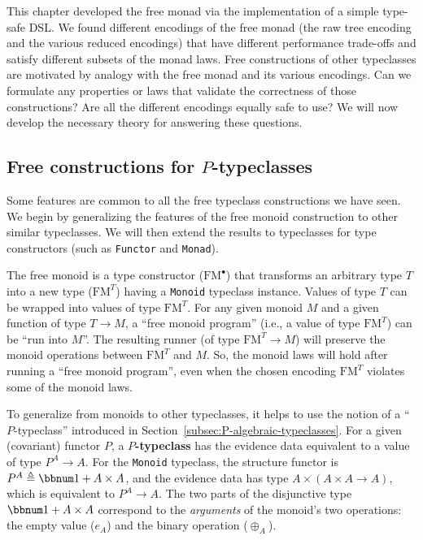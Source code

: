 This chapter developed the free monad via the implementation of a
simple type-safe DSL. We found different encodings of the free monad
(the raw tree encoding and the various reduced encodings) that have
different performance trade-offs and satisfy different subsets of
the monad laws. Free constructions of other typeclasses are motivated
by analogy with the free monad and its various encodings. Can we formulate
any properties or laws that validate the correctness of those constructions?
Are all the different encodings equally safe to use? We will now develop
the necessary theory for answering these questions.

\subsection{Free constructions for $P$-typeclasses\label{subsec:Free-constructions-for-inductive-typeclasses}}

Some features are common to all the free typeclass constructions we
have seen. We begin by generalizing the features of the free monoid
construction to other similar typeclasses. We will then extend the
results to typeclasses for type constructors (such as \lstinline!Functor!
and \lstinline!Monad!).

The free monoid is a type constructor ($\text{FM}^{\bullet}$) that
transforms an arbitrary type $T$ into a new type ($\text{FM}^{T}$)
having a \lstinline!Monoid!
typeclass instance. Values of type $T$ can be wrapped into values
of type $\text{FM}^{T}$. For any given monoid $M$ and a given function
of type $T\rightarrow M$, a \textsf{``}free monoid program\textsf{''} (i.e., a value
of type $\text{FM}^{T}$) can be \textsf{``}run into $M$\textsf{''}. The resulting
runner (of type $\text{FM}^{T}\rightarrow M$) will preserve the monoid
operations between $\text{FM}^{T}$ and $M$. So, the monoid laws
will hold after running a \textsf{``}free monoid program\textsf{''}, even when the
chosen encoding $\text{FM}^{T}$ violates some of the monoid laws.

To generalize from monoids to other typeclasses, it helps to use the
notion of a \textsf{``}$P$-typeclass\textsf{''} introduced in Section~\ref{subsec:P-algebraic-typeclasses}.
For a given (covariant) functor $P$, a $P$\textbf{-typeclass} 
has the evidence data equivalent to a value of type $P^{A}\rightarrow A$.
For the \lstinline!Monoid!
typeclass, the structure functor is $P^{A}\triangleq\bbnum 1+A\times A$,
and the evidence data has type $A\times\left(A\times A\rightarrow A\right)$,
which is equivalent to $P^{A}\rightarrow A$. The two parts of the
disjunctive type $\bbnum 1+A\times A$ correspond to the \emph{arguments}
of the monoid\textsf{'}s two operations: the empty value ($e_{A}$) and the
binary operation ($\oplus_{A}$). 

